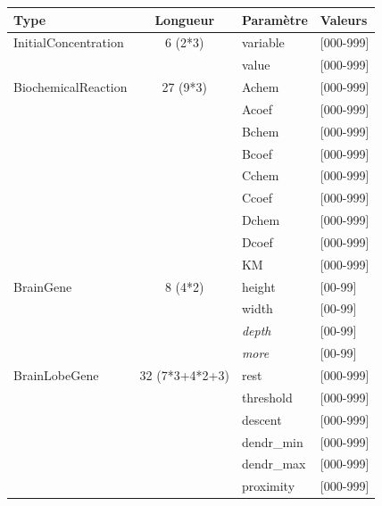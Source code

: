 \documentclass[11pt,twoside,a4paper]{article}
\begin{document}
\clearpage

\begin{table}[h]
	\begin{center} \begin{scriptsize}
	\begin{tabular}{|p{}|c|p{}|p{}|}
\hline
	\rowcolor{lightgray} Type	& Longueur	& Param{\`e}tre	& Valeurs \\ \hline
	InitialConcentration					&	6 (2*3)			&	variable	& [000-999] \\
	\cline{3-4} %
								&				&	value		& [000-999] \\
	\hline \hline
	BiochemicalReaction					&	27 (9*3)		&	Achem		& [000-999] \\
	\cline{3-4} %
								&				&	Acoef		& [000-999] \\
	\cline{3-4} %
								&				&	Bchem		& [000-999] \\
	\cline{3-4} %
								&				&	Bcoef		& [000-999] \\
	\cline{3-4} %
								&				&	Cchem		& [000-999] \\
	\cline{3-4} %
								&				&	Ccoef		& [000-999] \\
	\cline{3-4} %
								&				&	Dchem		& [000-999] \\
	\cline{3-4} %
								&				&	Dcoef		& [000-999] \\
	\cline{3-4} %
								&				&	KM		& [000-999] \\
	\hline \hline
	BrainGene						&	8 (4*2)				&	height		& [00-99] \\
	\cline{3-4} %
								&				&	width		& [00-99] \\
	\cline{3-4} %
								&				&	\textit{depth}	& [00-99] \\
	\cline{3-4} %
								&				&	\textit{more}	& [00-99] \\
	\hline \hline
	BrainLobeGene						& 32 (7*3+4*2+3)&	rest		& [000-999] \\
	\cline{3-4} %
								&				&	threshold	& [000-999] \\
	\cline{3-4} %
								&				&	descent		& [000-999] \\
	\cline{3-4} %
								&				&	dendr\_min	& [000-999] \\
	\cline{3-4} %
								&				&	dendr\_max	& [000-999] \\
	\cline{3-4} %
								&				&	proximity	& [000-999] \\

\end{tabular}
\end{scriptsize}
\end{center}
\end{table}
\end{document}

